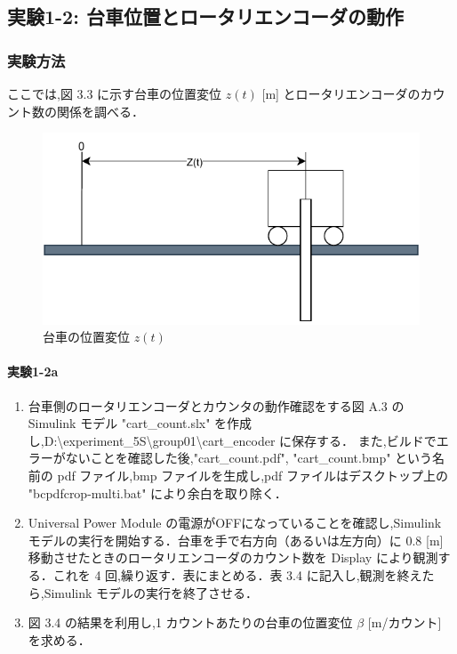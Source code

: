 \subsection{実験1-2: 台車位置とロータリエンコーダの動作}

\subsubsection{実験方法}
ここでは,図 3.3 に示す台車の位置変位 \( z(t) \) [m] とロータリエンコーダのカウント数の関係を調べる．

\begin{figure}[h]
  \centering
  \includegraphics[scale=1]{sozai/daisyanoichihenni.pdf}
  \caption{台車の位置変位 \( z(t) \)}
\end{figure}


\paragraph{実験1-2a}
\begin{enumerate}
  \item 台車側のロータリエンコーダとカウンタの動作確認をする図 A.3 の Simulink モデル
        "cart\_count.slx" を作成し,D:\textbackslash experiment\_5S\textbackslash group01\textbackslash cart\_encoder に保存する．
        また,ビルドでエラーがないことを確認した後,"cart\_count.pdf", "cart\_count.bmp" 
        という名前の pdf ファイル,bmp ファイルを生成し,pdf ファイルはデスクトップ上の 
        "bcpdfcrop-multi.bat" により余白を取り除く．
        
  \item Universal Power Module の電源がOFFになっていることを確認し,Simulink モデルの実行を開始する．台車を手で右方向（あるいは左方向）に 0.8 [m] 移動させたときのロータリエンコーダのカウント数を Display により観測する．これを 4 回,繰り返す．表にまとめる．表 3.4 に記入し,観測を終えたら,Simulink モデルの実行を終了させる．
        
  \item 図 3.4 の結果を利用し,1 カウントあたりの台車の位置変位 \( \beta \) [m/カウント] を求める．
\end{enumerate}


